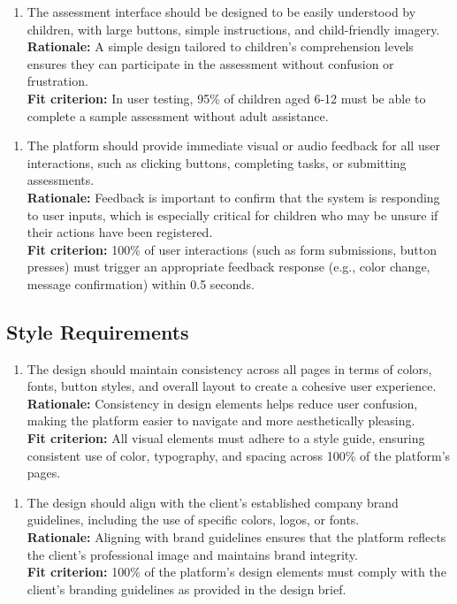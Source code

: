 \documentclass[12pt]{article}
\begin{document}
\begin{enumerate}[{LF-AR}4. ]
  \item The assessment interface should be designed to be easily understood by children, with large buttons, simple instructions, and child-friendly imagery.\\
  \textbf{Rationale: }A simple design tailored to children’s comprehension levels ensures they can participate in the assessment without confusion or frustration.\\
  \textbf{Fit criterion: }In user testing, 95\% of children aged 6-12 must be able to complete a sample assessment without adult assistance.  
\end{enumerate}
\begin{enumerate}[{LF-AR}5. ]
  \item The platform should provide immediate visual or audio feedback for all user interactions, such as clicking buttons, completing tasks, or submitting assessments.\\
  \textbf{Rationale: }Feedback is important to confirm that the system is responding to user inputs, which is especially critical for children who may be unsure if their actions have been registered.\\
  \textbf{Fit criterion: }100\% of user interactions (such as form submissions, button presses) must trigger an appropriate feedback response (e.g., color change, message confirmation) within 0.5 seconds.  
\end{enumerate}

\subsection{Style Requirements}
\begin{enumerate}[{LF-SR}1. ]
  \item The design should maintain consistency across all pages in terms of colors, fonts, button styles, and overall layout to create a cohesive user experience.\\
  \textbf{Rationale: }Consistency in design elements helps reduce user confusion, making the platform easier to navigate and more aesthetically pleasing.\\
  \textbf{Fit criterion: }All visual elements must adhere to a style guide, ensuring consistent use of color, typography, and spacing across 100\% of the platform’s pages.  
\end{enumerate}
\begin{enumerate}[{LF-SR}2. ]
  \item The design should align with the client's established company brand guidelines, including the use of specific colors, logos, or fonts.\\
  \textbf{Rationale: }Aligning with brand guidelines ensures that the platform reflects the client's professional image and maintains brand integrity.\\
  \textbf{Fit criterion: }100\% of the platform’s design elements must comply with the client’s branding guidelines as provided in the design brief.  
\end{enumerate}
\end{document}
